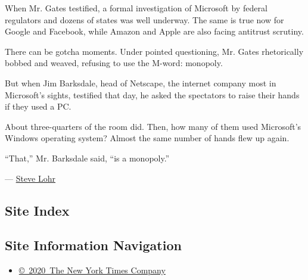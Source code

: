 When Mr. Gates testified, a formal investigation of Microsoft by federal
regulators and dozens of states was well underway. The same is true now
for Google and Facebook, while Amazon and Apple are also facing
antitrust scrutiny.

There can be gotcha moments. Under pointed questioning, Mr. Gates
rhetorically bobbed and weaved, refusing to use the M-word: monopoly.

But when Jim Barksdale, head of Netscape, the internet company most in
Microsoft's sights, testified that day, he asked the spectators to raise
their hands if they used a PC.

About three-quarters of the room did. Then, how many of them used
Microsoft's Windows operating system? Almost the same number of hands
flew up again.

``That,'' Mr. Barksdale said, ``is a monopoly.''

--- \href{https://www.nytimes.com/by/steve-lohr}{Steve Lohr}

\hypertarget{site-index}{%
\subsection{Site Index}\label{site-index}}

\hypertarget{site-information-navigation}{%
\subsection{Site Information
Navigation}\label{site-information-navigation}}

\begin{itemize}
\tightlist
\item
  \href{https://help.nytimes.com/hc/en-us/articles/115014792127-Copyright-notice}{©~2020~The
  New York Times Company}
\end{itemize}

